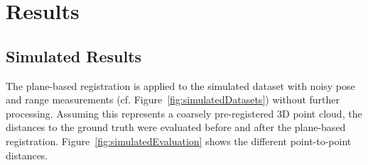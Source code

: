 \section{Results}

\subsection{Simulated Results}

The plane-based registration is applied to the simulated dataset with noisy pose and range measurements (cf. Figure~\ref{fig:simulatedDatasets}) without further processing.
Assuming this represents a coarsely pre-registered 3D point cloud, the distances to the ground truth were evaluated before and after the plane-based registration. 
Figure~\ref{fig:simulatedEvaluation}  shows the different point-to-point distances. 

